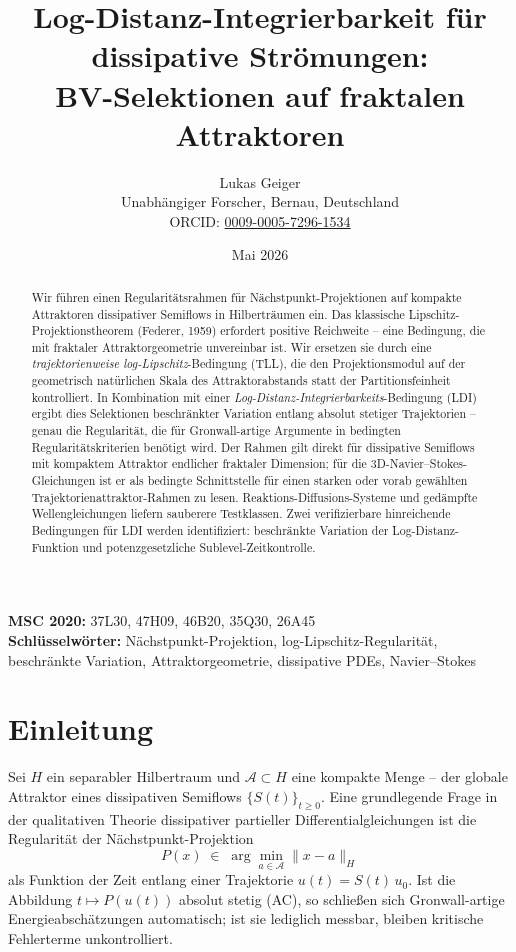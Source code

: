 \documentclass[12pt,a4paper]{article}
\title{\textbf{Log-Distanz-Integrierbarkeit für dissipative Strömungen:\\
BV-Selektionen auf fraktalen Attraktoren}}
\author{Lukas Geiger\\
\small Unabhängiger Forscher, Bernau, Deutschland\\
\small ORCID: \href{https://orcid.org/0009-0005-7296-1534}{0009-0005-7296-1534}}
\date{Mai 2026}
\theoremstyle{definition}
\theoremstyle{plain}
\theoremstyle{remark}
\begin{document}
\maketitle

\begin{center}
\small
\textbf{MSC 2020:} 37L30, 47H09, 46B20, 35Q30, 26A45\\
\textbf{Schlüsselwörter:} Nächstpunkt-Projektion, log-Lipschitz-Regularität,
beschränkte Variation, Attraktorgeometrie, dissipative PDEs, Navier--Stokes
\end{center}

\begin{abstract}
Wir führen einen Regularitätsrahmen für Nächstpunkt-Projektionen
auf kompakte Attraktoren dissipativer Semiflows in Hilberträumen ein.
Das klassische Lipschitz-Projektionstheorem (Federer, 1959) erfordert
positive Reichweite -- eine Bedingung, die mit fraktaler
Attraktorgeometrie unvereinbar ist.  Wir ersetzen sie durch eine
\emph{trajektorienweise log-Lipschitz}-Bedingung (TLL), die den
Projektionsmodul auf der geometrisch natürlichen Skala des
Attraktorabstands statt der Partitionsfeinheit kontrolliert.
In Kombination mit einer \emph{Log-Distanz-Integrierbarkeits}-Bedingung
(LDI) ergibt dies Selektionen beschränkter Variation entlang absolut
stetiger Trajektorien -- genau die Regularität, die für
Gronwall-artige Argumente in bedingten Regularitätskriterien
benötigt wird.  Der Rahmen gilt direkt für dissipative Semiflows
mit kompaktem Attraktor endlicher fraktaler Dimension; für die
3D-Navier--Stokes-Gleichungen ist er als bedingte Schnittstelle für
einen starken oder vorab gewählten Trajektorienattraktor-Rahmen zu
lesen. Reaktions-Diffusions-Systeme und gedämpfte Wellengleichungen
liefern sauberere Testklassen.  Zwei verifizierbare hinreichende
Bedingungen für LDI werden identifiziert: beschränkte Variation
der Log-Distanz-Funktion und potenzgesetzliche Sublevel-Zeitkontrolle.
\end{abstract}

\clearpage
{}
\tableofcontents
\clearpage
{}

\section{Einleitung}

Sei $H$ ein separabler Hilbertraum und $\mathcal{A} \subset H$ eine
kompakte Menge -- der globale Attraktor eines dissipativen Semiflows
$\{S(t)\}_{t \ge 0}$.  Eine grundlegende Frage in der qualitativen
Theorie dissipativer partieller Differentialgleichungen ist die
Regularität der Nächstpunkt-Projektion
\[
  P(x) \;\in\; \arg\min_{a \in \mathcal{A}} \|x - a\|_H
\]
als Funktion der Zeit entlang einer Trajektorie $u(t) = S(t)\,u_0$.
Ist die Abbildung $t \mapsto P(u(t))$ absolut stetig (AC), so
schließen sich Gronwall-artige Energieabschätzungen automatisch;
ist sie lediglich messbar, bleiben kritische Fehlerterme
unkontrolliert.
\end{document}
